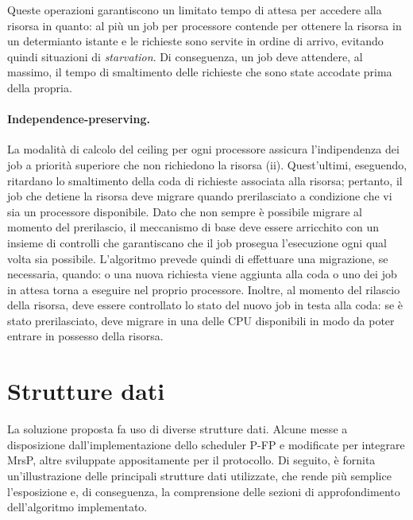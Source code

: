 Queste operazioni garantiscono un limitato tempo di attesa per accedere alla risorsa in quanto: al più un job per processore contende per ottenere la risorsa in un determianto istante e le richieste sono servite in ordine di arrivo, evitando quindi situazioni di \textit{starvation}. Di conseguenza, un job deve attendere, al massimo, il tempo di smaltimento delle richieste che sono state accodate prima della propria. 

\paragraph{Independence-preserving.} La modalità di calcolo del ceiling per ogni processore assicura l'indipendenza dei job a priorità superiore che non richiedono la risorsa (ii). Quest'ultimi, eseguendo, ritardano lo smaltimento della coda di richieste associata alla risorsa; pertanto, il job che detiene la risorsa deve migrare quando prerilasciato a condizione che vi sia un processore disponibile. Dato che non sempre è possibile migrare al momento del prerilascio, il meccanismo di base deve essere arricchito con un insieme di controlli che garantiscano che il job prosegua l'esecuzione ogni qual volta sia possibile. L'algoritmo prevede quindi di effettuare una migrazione, se necessaria, quando: o una nuova richiesta viene aggiunta alla coda o uno dei job in attesa torna a eseguire nel proprio processore. Inoltre, al momento del rilascio della risorsa, deve essere controllato lo stato del nuovo job in testa alla coda: se è stato prerilasciato, deve migrare in una delle CPU disponibili in modo da poter entrare in possesso della risorsa.

\section{Strutture dati}
\label{sec:impl.struct}

La soluzione proposta fa uso di diverse strutture dati. Alcune messe a disposizione dall'implementazione dello scheduler P-FP e modificate per integrare MrsP, altre sviluppate appositamente per il protocollo. Di seguito, è fornita un'illustrazione delle principali strutture dati utilizzate, che rende più semplice l'esposizione e, di conseguenza, la comprensione delle sezioni di approfondimento dell'algoritmo implementato.

